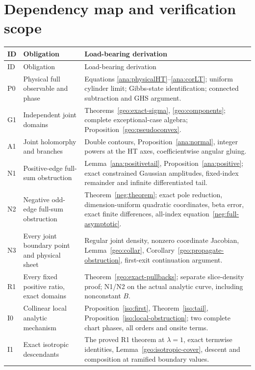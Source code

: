 \documentclass[11pt]{article}
\numberwithin{equation}{section}
\theoremstyle{definition}
\begin{document}
\section{Dependency map and verification scope}
\label{main:verification}

\begin{longtable}{@{}p{}p{}p{}@{}}
\toprule
ID & Obligation & Load-bearing derivation \\
\midrule
\endfirsthead
\toprule ID & Obligation & Load-bearing derivation \\
\midrule
\endhead
P0 & Physical full observable and phase & Equations
\eqref{ana:physicalHT}--\eqref{ana:corLT}; uniform cylinder limit;
Gibbs-state identification; connected subtraction and GHS argument. \\[3pt]
G1 & Independent joint domains & Theorems~\ref{geo:exact-sigma},
\ref{geo:components}; complete exceptional-case algebra;
Proposition~\ref{geo:pseudoconvex}. \\[3pt]
A1 & Joint holomorphy and branches & Double contours,
Proposition~\ref{ana:normal}, integer powers at the HT axes,
coefficientwise angular gluing. \\[3pt]
N1 & Positive-edge full-sum obstruction & Lemma~\ref{ana:positivetail},
Proposition~\ref{ana:positive}; exact constrained Gaussian amplitudes,
fixed-index remainder and infinite differentiated tail. \\[3pt]
N2 & Negative odd-edge full-sum obstruction &
Theorem~\ref{neg:theorem}; exact pole reduction, dimension-uniform
quadratic coordinates, beta error, exact finite differences,
all-index equation~\eqref{neg:full-asymptotic}. \\[3pt]
N3 & Every joint boundary point and physical sheet &
Regular joint density, nonzero coordinate Jacobian,
Lemma~\ref{geo:collar}, Corollary~\ref{geo:propagate-obstruction},
first-exit continuation argument. \\[3pt]
R1 & Every fixed positive ratio, exact domains &
Theorem~\ref{geo:exact-pullbacks}; separate slice-density proof;
N1/N2 on the actual analytic curve, including nonconstant \(B\). \\[3pt]
I0 & Collinear local analytic mechanism &
Proposition~\ref{iso:first}, Theorem~\ref{iso:tail},
Proposition~\ref{iso:local-obstruction}; two complete chart phases,
all orders and onsite terms. \\[3pt]
I1 & Exact isotropic descendants &
The proved R1 theorem at \(\lambda=1\), exact termwise identities,
Lemma~\ref{geo:isotropic-cover}, descent and composition at
ramified boundary values. \\
\bottomrule
\end{longtable}
\end{document}

